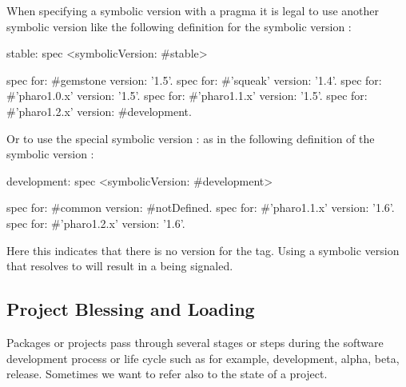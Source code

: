 \documentclass[a4paper,10pt,twoside]{book}
\begin{document}



When specifying a symbolic version with a  pragma it is legal to use another symbolic version like the following definition for the symbolic version :

\begin{code}{}
stable: spec
       <symbolicVersion: #stable>

       spec for: #gemstone version: '1.5'.
       spec for: #'squeak' version: '1.4'.
       spec for: #'pharo1.0.x' version: '1.5'.
       spec for: #'pharo1.1.x' version: '1.5'.
       spec for: #'pharo1.2.x' version: #development.
\end{code}

Or to use the special symbolic version : as in the following definition of the symbolic version :

\begin{code}{}
development: spec
       <symbolicVersion: #development>

       spec for: #common version: #notDefined.
       spec for: #'pharo1.1.x' version: '1.6'.
       spec for: #'pharo1.2.x' version: '1.6'.
\end{code}

Here this indicates that there is no version for the  tag. 
Using a symbolic version that resolves to  will result in a  being signaled.







\subsection{Project Blessing and Loading}
Packages or projects pass through several stages or steps during the software development process or life cycle such as for example, development, alpha, beta, release. Sometimes we want to refer also to the state of a project.
\end{document}
